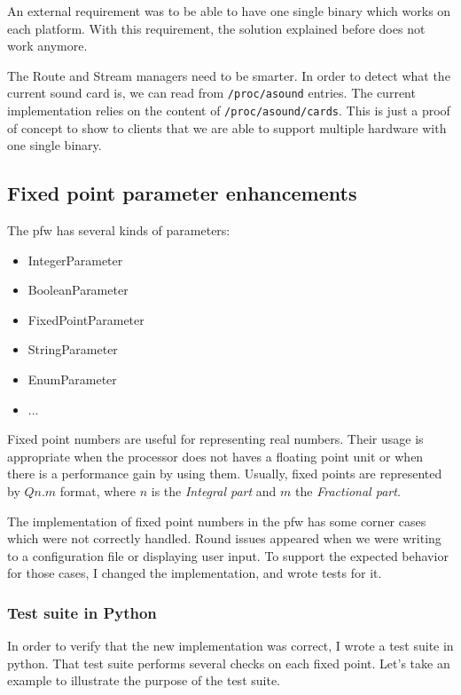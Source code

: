 An external requirement was to be able to have one single binary which works on each platform. With this
requirement, the solution explained before does not work anymore.

The Route and Stream managers need to be smarter. In
order to detect what the current sound card is, we can read from \lstinline{/proc/asound} entries.
The current implementation relies on the content of \lstinline{/proc/asound/cards}.
This is just a proof of concept to show to clients that we are able to support multiple hardware
with one single binary.


\subsection{Fixed point parameter enhancements}
The \gls{pfw} has several kinds of parameters:
\begin{itemize}
    \item IntegerParameter
    \item BooleanParameter
    \item FixedPointParameter
    \item StringParameter
    \item EnumParameter
    \item ...
\end{itemize}

Fixed point numbers are useful for representing real numbers. Their
usage is appropriate when the processor does not haves a floating point unit
or when there is a performance gain by using them. Usually, fixed points are
represented by $Qn.m$ format, where $n$ is the \emph{Integral part} and $m$ the
\emph{Fractional part}.

The implementation of fixed point numbers in the \gls{pfw} has some
corner cases which were not correctly handled. Round issues appeared when we
were writing to a configuration file or displaying user input. To
support the expected behavior for those cases, I changed the implementation, and
wrote tests for it.

\subsubsection{Test suite in Python}

In order to verify that the new implementation was correct, I wrote a test suite
in \gls{python}. That test suite performs several checks on each fixed point. Let's
take an example to illustrate the purpose of the test suite.

